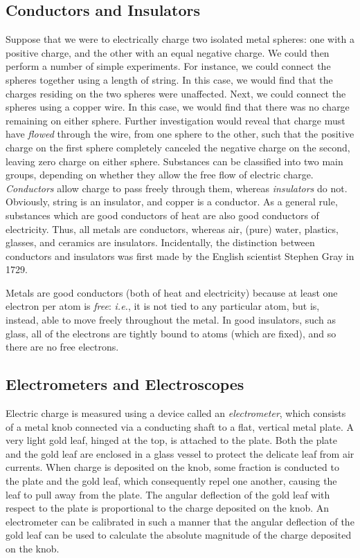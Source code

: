 \subsection{Conductors and Insulators}
Suppose that we were to electrically charge two isolated metal spheres: one with a positive
charge, and the other with an equal negative charge. We could then perform
a number of simple experiments. For instance, we could connect the spheres 
together using
a length of string. In this case, we would find that the charges residing on
the two spheres were unaffected. Next, we could connect the spheres using a
copper wire. In this case, we would find that there was no charge
remaining on either sphere. Further investigation would reveal that charge
must have {\em flowed}\/ through the wire, from one sphere to the other, such that the
positive charge on the first sphere completely canceled the negative charge on the
second, leaving zero charge on either sphere. Substances can be classified
into two main groups, depending on whether they allow 
the free flow of electric charge. {\em Conductors}\/ allow charge to pass freely
through
them, whereas {\em insulators}\/ do not. Obviously, string is an insulator,
and copper is a conductor. As a general rule, substances which are good
conductors of heat are also good conductors of electricity. Thus,
all metals are conductors, whereas air, (pure) water, plastics, glasses,
and ceramics
are insulators. Incidentally, the distinction between conductors and
insulators was first made by the English scientist Stephen Gray in 1729.

Metals are good conductors (both of heat and electricity) because at least
one electron per atom is {\em free}: {\em i.e.}, it is not tied to
any particular atom, but is, instead, able to move freely throughout the
metal. In good insulators, such as glass, all of the electrons are tightly
bound to  atoms (which are fixed), and so there are no free electrons.

\subsection{Electrometers and Electroscopes}
Electric
charge is measured using a device called an {\em electrometer}, which consists
of a metal  knob connected via a conducting shaft to a flat, vertical metal
plate. A very light gold leaf, hinged at the top, is attached to the plate.
Both the plate and the gold leaf are enclosed in a  glass vessel to protect the delicate
leaf from air currents. When charge is deposited on the knob, some fraction
is conducted to the plate and the gold leaf, which consequently
repel one another, causing the  leaf to pull away from the plate. 
The angular deflection of the gold leaf with respect to the  plate is
proportional to the charge deposited on the knob. An electrometer can be
calibrated in such a manner that the angular deflection of the gold leaf 
can be used to calculate the absolute magnitude of the charge deposited on the knob.

